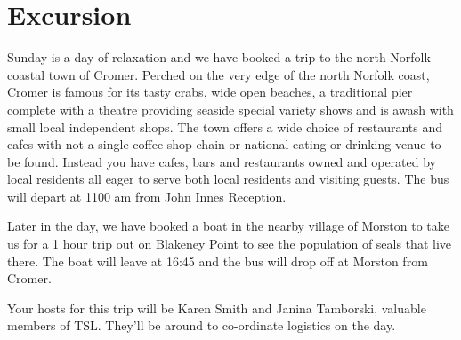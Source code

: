 \documentclass[12pt,]{book}
\theoremstyle{definition}
\theoremstyle{definition}
\theoremstyle{remark}
\begin{document}
\section*{Excursion}\label{excursion}

Sunday is a day of relaxation and we have booked a trip to the north
Norfolk coastal town of Cromer. Perched on the very edge of the north
Norfolk coast, Cromer is famous for its tasty crabs, wide open beaches,
a traditional pier complete with a theatre providing seaside special
variety shows and is awash with small local independent shops. The town
offers a wide choice of restaurants and cafes with not a single coffee
shop chain or national eating or drinking venue to be found. Instead you
have cafes, bars and restaurants owned and operated by local residents
all eager to serve both local residents and visiting guests. The bus
will depart at 1100 am from John Innes Reception.

Later in the day, we have booked a boat in the nearby village of Morston
to take us for a 1 hour trip out on Blakeney Point to see the population
of seals that live there. The boat will leave at 16:45 and the bus will
drop off at Morston from Cromer.

Your hosts for this trip will be Karen Smith and Janina Tamborski,
valuable members of TSL. They'll be around to co-ordinate logistics on
the day.


\end{document}
